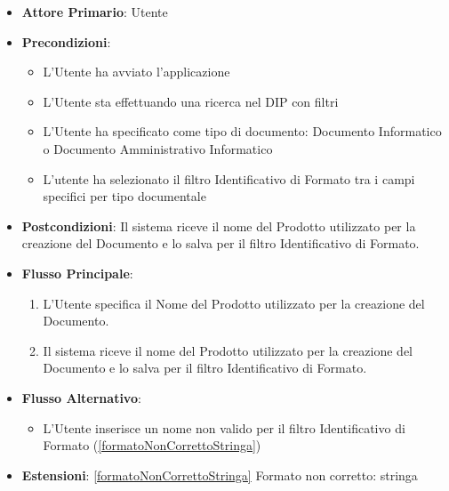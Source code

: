 \begin{itemize}
      \item \textbf{Attore Primario}: Utente
      \item \textbf{Precondizioni}: 
      \begin{itemize}
            \item L'Utente ha avviato l'applicazione
            \item L'Utente sta effettuando una ricerca nel DIP con filtri
            \item L'Utente ha specificato come tipo di documento: Documento Informatico o Documento Amministrativo Informatico
            \item L'utente ha selezionato il filtro Identificativo di Formato tra i campi specifici per tipo documentale
      \end{itemize}
      \item \textbf{Postcondizioni}: Il sistema riceve il nome del Prodotto utilizzato per la creazione del Documento e lo salva per il filtro Identificativo di Formato.
      \item \textbf{Flusso Principale}:
      \begin{enumerate}
            \item L'Utente specifica il Nome del Prodotto utilizzato per la creazione del Documento.
            \item Il sistema riceve il nome del Prodotto utilizzato per la creazione del Documento e lo salva per il filtro Identificativo di Formato.
      \end{enumerate}
      \item \textbf{Flusso Alternativo}:
      \begin{itemize}
            \item L'Utente inserisce un nome non valido per il filtro Identificativo di Formato (\ref{formatoNonCorrettoStringa})
      \end{itemize}
      \item \textbf{Estensioni}: \ref{formatoNonCorrettoStringa} Formato non corretto: stringa
\end{itemize}

